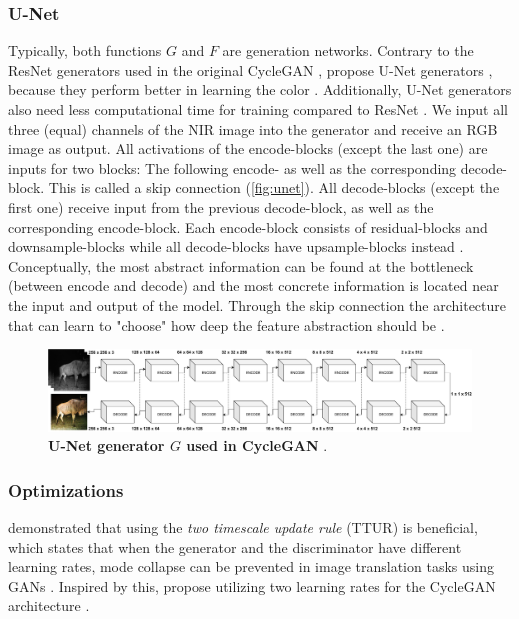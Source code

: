 \subsubsection*{U-Net}
\label{sec:cycle-gan-u-net}
Typically, both functions $G$ and $F$ are generation networks. Contrary to the ResNet generators \parencite{resnet} \citeauthor{cyclegan-original} used in the original CycleGAN \parencite{cyclegan-original},
\citeauthor*{mehri} propose U-Net generators \parencite{unet}, because they perform better in learning the color \parencite{mehri}.
Additionally, U-Net generators also need less computational time for training compared to ResNet \parencite{mehri}.
We input all three (equal) channels of the NIR image into the generator and receive an RGB image as output.
All activations of the encode-blocks (except the last one) are inputs for two blocks:
The following encode- as well as the corresponding decode-block. This is called a skip connection \parencite{unet} (\autoref{fig:unet}). 
All decode-blocks (except the first one) receive input from the previous decode-block, as well as the corresponding encode-block.
Each encode-block consists of residual-blocks and downsample-blocks while all decode-blocks have upsample-blocks instead \parencite{unet}. 
Conceptually, the most abstract information can be found at the bottleneck (between encode and decode) and the most concrete information is located near the input and output of the model.
Through the skip connection the architecture that can learn to "choose" how deep the feature abstraction should be \parencite{unet}.

\begin{figure}[h]
   \includegraphics[width=\textwidth]{gfx/CycleGAN-Unet.pdf}
   \caption{
      \textbf{U-Net generator $G$ used in CycleGAN} \parencite{unet,mehri}.
   }
   \label{fig:unet}
\end{figure}

\subsubsection*{Optimizations}
 demonstrated that using the \textit{two timescale update rule} (TTUR) is beneficial, which states that when the generator and the discriminator have different learning rates,
mode collapse can be prevented in image translation tasks using GANs \parencite{ttur}. %
Inspired by this, \citeauthor*{mehri} propose utilizing two learning rates for the CycleGAN architecture \parencite{mehri}.

